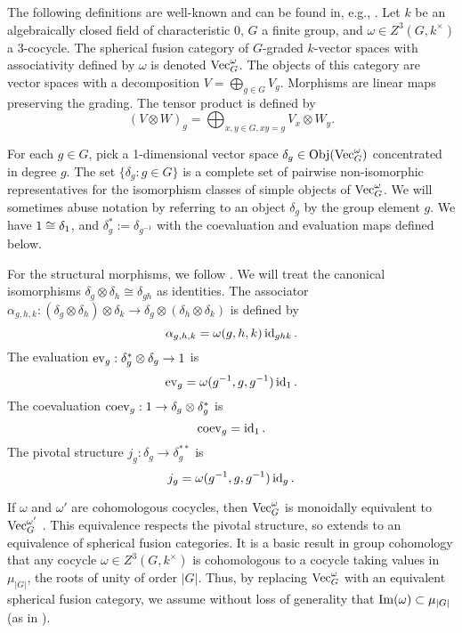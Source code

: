 The following definitions are well-known and can be found in, e.g., \cite{etingofTensor}.  Let $k$ be an algebraically closed field of characteristic 0,  $G$ a finite group, and $\omega \in Z^3(G, k^\times)$ a 3-cocycle.    The spherical fusion category of $G$-graded $k$-vector spaces with associativity defined by $\omega$ is denoted $\operatorname{Vec}_G^\omega$.  The objects of this category are vector spaces with a decomposition $V = \bigoplus_{g \in G} V_g$. Morphisms are linear maps preserving the grading. The tensor product is defined by
$$ (V \otimes W)_g = \bigoplus_{x,y \in G, xy = g} V_x \otimes W_y. $$

For each $g \in G$, pick a 1-dimensional vector space $\delta_g \in \operatorname{Obj}(\operatorname{Vec}_G^\omega)$ concentrated in degree $g$.  The set $\{\delta_g : g \in G\}$ is a complete set of pairwise non-isomorphic representatives for the isomorphism classes of simple objects of $\operatorname{Vec}_G^\omega$.  We will sometimes abuse notation by referring to an object $\delta_g$ by the group element $g$.  We have $1 \cong \delta_1$, and  $\delta_g^* := \delta_{g^{-1}}$ with the coevaluation and evaluation maps defined below.

For the structural morphisms,  we follow \cite{math/0601012}.  We will treat the canonical isomorphisms $\delta_g \otimes \delta_h \cong \delta_{gh}$ as identities.    The associator $\alpha_{g,h,k}:(\delta_g \otimes \delta_h) \otimes \delta_k \to \delta_g \otimes (\delta_h \otimes \delta_k)$ is defined by
$$\alpha_{g,h,k} = \omega(g,h,k) \operatorname{id}_{ghk}.$$ 
The evaluation $\operatorname{ev}_g:\delta_g^* \otimes \delta_g \to 1$ is 
$$\operatorname{ev}_{g} = \omega(g^{-1},g,g^{-1}) \operatorname{id}_1.$$  
The coevaluation $\operatorname{coev}_g:1 \to \delta_g \otimes \delta_g^*$ is 
$$\operatorname{coev}_{g} = \operatorname{id}_1.$$ 
The pivotal structure $j_g:\delta_g \to \delta_g^{**}$ is 
$$j_{g} = \omega(g^{-1},g,g^{-1}) \operatorname{id}_{g}.$$

If $\omega$ and $\omega'$ are cohomologous cocycles, then $\operatorname{Vec}_G^\omega$ is monoidally equivalent to $\operatorname{Vec}_G^{\omega'}$ \cite{etingofTensor}.  This equivalence respects the pivotal structure, so extends to an equivalence of spherical fusion categories.  It is a basic result in group cohomology that any cocycle $\omega \in Z^3(G, k^\times)$ is cohomologous to a cocycle taking values in $\mu_{|G|}$, the roots of unity of order $|G|$.  Thus, by replacing $\operatorname{Vec}^\omega_G$ with an equivalent spherical fusion category, we assume  without loss of generality that $\operatorname{Im}(\omega) \subset \mu_{|G|}$ (as in \cite{erw}).  


